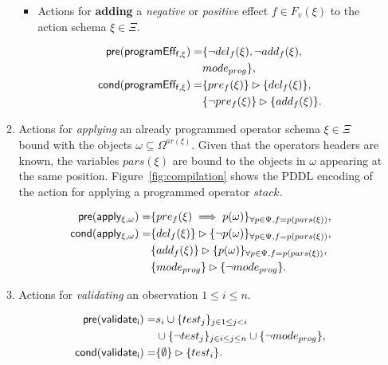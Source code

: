 \documentclass{article}
\newcommand{\pre}{\mathsf{pre}}     %
\newcommand{\cond}{\mathsf{cond}}   %
\begin{document}
\begin{itemize}
\begin{enumerate}
\begin{itemize}
\item Actions for {\bf adding} a {\em negative} or {\em positive} effect $f\in F_v(\xi)$ to the action schema $\xi\in\Xi$.

\begin{small}
\begin{align*}
\hspace*{7pt}\pre(\mathsf{programEff_{f,\xi}})=&\{\neg del_{f}(\xi),\neg add_{f}(\xi),\\
& mode_{prog}\},\\
\cond(\mathsf{programEff_{f,\xi}})=&\{pre_{f}(\xi)\}\rhd\{del_{f}(\xi)\},\\
&\{\neg pre_{f}(\xi)\}\rhd\{add_{f}(\xi)\}.
\end{align*}
\end{small}
\end{itemize}

\item Actions for {\em applying} an already programmed operator schema $\xi\in\Xi$ bound with the objects $\omega\subseteq\Omega^{ar(\xi)}$. Given that the operators headers are known, the variables $pars(\xi)$ are bound to the objects in $\omega$ appearing at the same position. Figure~\ref{fig:compilation} shows the PDDL encoding of the action for applying a programmed operator $stack$.
\begin{small}
\begin{align*}
\hspace*{7pt}\pre(\mathsf{apply_{\xi,\omega}})=&\{pre_{f}(\xi)\implies p(\omega)\}_{\forall p\in\Psi,f=p(pars(\xi))},\\
\cond(\mathsf{apply_{\xi,\omega}})=&\{del_{f}(\xi)\}\rhd\{\neg p(\omega)\}_{\forall p\in\Psi,f=p(pars(\xi))},\\
&\{add_{f}(\xi)\}\rhd\{p(\omega)\}_{\forall p\in\Psi,f=p(pars(\xi))},\\
&\{mode_{prog}\}\rhd\{\neg mode_{prog}\}.
\end{align*}
\end{small}

\item Actions for {\em validating} an observation {\tt\small $1\leq i\leq n$}.
\begin{small}
\begin{align*}
\hspace*{7pt}\pre(\mathsf{validate_{i}})=&s_i\cup\{test_j\}_{j\in 1\leq j<i}\\
&\cup\{\neg test_j\}_{j\in i\leq j\leq n}\cup \{\neg mode_{prog}\},\\
\cond(\mathsf{validate_{i}})=&\{\emptyset\}\rhd\{test_i\}.
\end{align*}
\end{small}
\end{enumerate}
\end{itemize}
\end{document}
